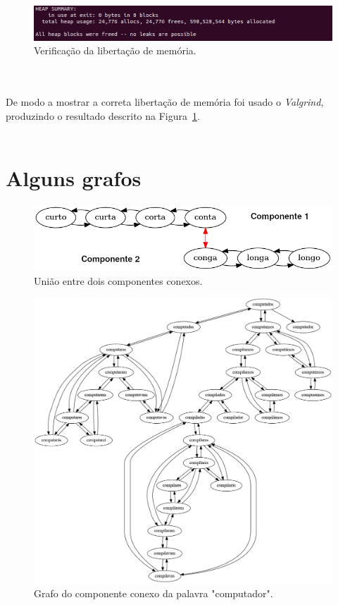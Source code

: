 	\begin{figure}[h!]
    \centering
    \includegraphics[scale=0.40]{memoryleaks.png}
    \caption{Verificação da libertação de memória.}
    \label{fig:memoryleaks}
	\end{figure}\\\\
De modo a mostrar a correta libertação de memória foi usado o \textit{Valgrind}, produzindo o resultado descrito na Figura~\ref{fig:memoryleaks}.\\\\
	
	\section{Alguns grafos}	
	\label{grafos}
	\begin{figure}[h!]
    \centering
    \includegraphics[scale=0.40]{uniao.png}
    \caption{União entre dois componentes conexos.}
	\end{figure}
\pagebreak
	\begin{figure}[h!]
    \centering
    \includegraphics[scale=0.40]{graph1.png}
    \caption{Grafo do componente conexo da palavra "computador".}
	\end{figure}
